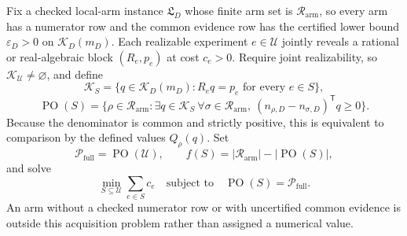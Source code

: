 Fix a checked local-arm instance \(\mathfrak L_D\) whose finite arm set is \(\mathcal R_{\mathrm{arm}}\), so every arm has a numerator row and the common evidence row has the certified lower bound \(\varepsilon_D>0\) on \(\mathcal K_D(m_D)\).  Each realizable experiment \(e\in\mathcal U\) jointly reveals a rational or real-algebraic block \((R_e,p_e)\) at cost \(c_e>0\).  Require joint realizability, so \(\mathcal K_{\mathcal U}\ne\varnothing\), and define
\[
\mathcal K_S=\{q\in\mathcal K_D(m_D):R_eq=p_e\text{ for every }e\in S\},
\]
\[
\operatorname{PO}(S)=\{\rho\in\mathcal R_{\mathrm{arm}}:\exists q\in\mathcal K_S\ \forall\sigma\in\mathcal R_{\mathrm{arm}},\ (n_{\rho,D}-n_{\sigma,D})^{\mathsf T}q\ge0\}.
\]
Because the denominator is common and strictly positive, this is equivalent to comparison by the defined values \(Q_\rho(q)\).  Set
\[
\mathcal P_{\mathrm{full}}=\operatorname{PO}(\mathcal U),\qquad
f(S)=|\mathcal R_{\mathrm{arm}}|-|\operatorname{PO}(S)|,
\]
and solve
\[
\min_{S\subseteq\mathcal U}\sum_{e\in S}c_e
\quad\text{subject to}\quad
\operatorname{PO}(S)=\mathcal P_{\mathrm{full}}.
\]
An arm without a checked numerator row or with uncertified common evidence is outside this acquisition problem rather than assigned a numerical value.